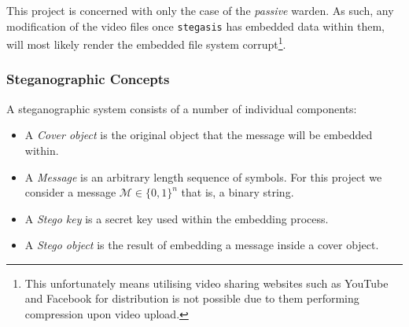 \documentclass[paper=a4, fontsize=11pt,twoside]{scrartcl}    %
\numberwithin{table}{section}
\numberwithin{figure}{section}
\numberwithin{algorithm}{section}
\begin{document}
This project is concerned with only the case of the \textit{passive} warden. As such, any modification of the video files once \texttt{stegasis} has embedded data within them, will most likely render the embedded file system corrupt\footnote{This unfortunately means utilising video sharing websites such as YouTube and Facebook for distribution is not possible due to them performing compression upon video upload.}.


\subsubsection{Steganographic Concepts}
A steganographic system consists of a number of individual components:
\begin{itemize}
	\item A \textit{Cover object} is the original object that the message will be embedded within.
	\item A \textit{Message} is an arbitrary length sequence of symbols. For this project we consider a message $\mathcal{M} \in \{0,1\}^{n} $ that is, a binary string.
	\item A \textit{Stego key} is a secret key used within the embedding process.
	\item A \textit{Stego object} is the result of embedding a message inside a cover object.
\end{itemize}
\end{document}

